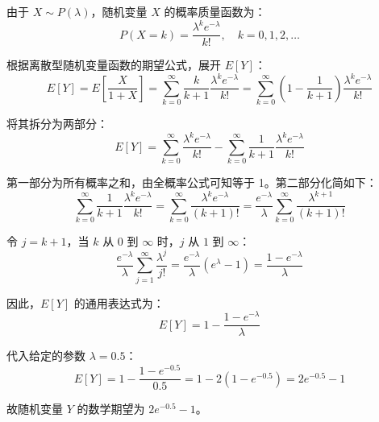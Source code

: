 ﻿\documentclass[lang=cn,11pt]{elegantbook}
\begin{document}
\begin{solution}
由于 $X \sim P(\lambda)$，随机变量 $X$ 的概率质量函数为：
$$P(X = k) = \frac{\lambda^k e^{-\lambda}}{k!}, \quad k = 0, 1, 2, \dots$$

根据离散型随机变量函数的期望公式，展开 $E[Y]$：
$$E[Y] = E\left[\frac{X}{1+X}\right] = \sum_{k=0}^{\infty} \frac{k}{k+1} \frac{\lambda^k e^{-\lambda}}{k!} = \sum_{k=0}^{\infty} \left(1 - \frac{1}{k+1}\right) \frac{\lambda^k e^{-\lambda}}{k!}$$

将其拆分为两部分：
$$E[Y] = \sum_{k=0}^{\infty} \frac{\lambda^k e^{-\lambda}}{k!} - \sum_{k=0}^{\infty} \frac{1}{k+1} \frac{\lambda^k e^{-\lambda}}{k!}$$

第一部分为所有概率之和，由全概率公式可知等于 1。第二部分化简如下：
$$\sum_{k=0}^{\infty} \frac{1}{k+1} \frac{\lambda^k e^{-\lambda}}{k!} = \sum_{k=0}^{\infty} \frac{\lambda^k e^{-\lambda}}{(k+1)!} = \frac{e^{-\lambda}}{\lambda} \sum_{k=0}^{\infty} \frac{\lambda^{k+1}}{(k+1)!}$$

令 $j = k+1$，当 $k$ 从 $0$ 到 $\infty$ 时，$j$ 从 $1$ 到 $\infty$：
$$\frac{e^{-\lambda}}{\lambda} \sum_{j=1}^{\infty} \frac{\lambda^j}{j!} = \frac{e^{-\lambda}}{\lambda} (e^\lambda - 1) = \frac{1 - e^{-\lambda}}{\lambda}$$

因此，$E[Y]$ 的通用表达式为：
$$E[Y] = 1 - \frac{1 - e^{-\lambda}}{\lambda}$$

代入给定的参数 $\lambda = 0.5$：
$$E[Y] = 1 - \frac{1 - e^{-0.5}}{0.5} = 1 - 2(1 - e^{-0.5}) = 2e^{-0.5} - 1$$

故随机变量 $Y$ 的数学期望为 $2e^{-0.5} - 1$。
\end{solution}

\vspace{2em}
\end{document}
